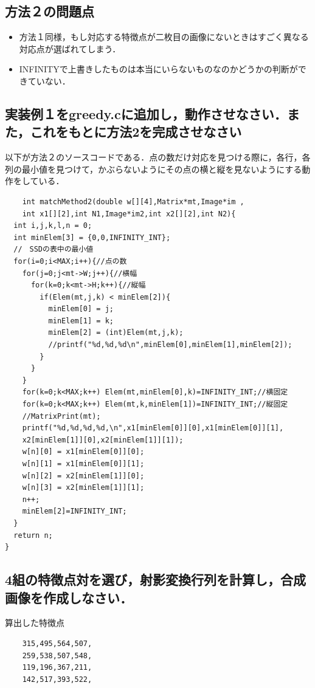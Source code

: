 \documentclass[11pt]{jarticle}
\begin{document}
\subsection{方法２の問題点}
\begin{itemize}
    \item 方法１同様，もし対応する特徴点が二枚目の画像にないときはすごく異なる対応点が選ばれてしまう．
    \item INFINITYで上書きしたものは本当にいらないものなのかどうかの判断ができていない．
  \end{itemize}

\subsection{実装例１をgreedy.cに追加し，動作させなさい．また，これをもとに方法2を完成させなさい}
以下が方法２のソースコードである．点の数だけ対応を見つける際に，各行，各列の最小値を見つけて，かぶらないようにその点の横と縦を見ないようにする動作をしている．
\begin{verbatim}
    int matchMethod2(double w[][4],Matrix*mt,Image*im ,
    int x1[][2],int N1,Image*im2,int x2[][2],int N2){
  int i,j,k,l,n = 0;
  int minElem[3] = {0,0,INFINITY_INT};
  //　SSDの表中の最小値
  for(i=0;i<MAX;i++){//点の数
    for(j=0;j<mt->W;j++){//横幅
      for(k=0;k<mt->H;k++){//縦幅
        if(Elem(mt,j,k) < minElem[2]){
          minElem[0] = j;
          minElem[1] = k;
          minElem[2] = (int)Elem(mt,j,k);
          //printf("%d,%d,%d\n",minElem[0],minElem[1],minElem[2]);
        }
      }
    }
    for(k=0;k<MAX;k++) Elem(mt,minElem[0],k)=INFINITY_INT;//横固定
    for(k=0;k<MAX;k++) Elem(mt,k,minElem[1])=INFINITY_INT;//縦固定
    //MatrixPrint(mt);
    printf("%d,%d,%d,%d,\n",x1[minElem[0]][0],x1[minElem[0]][1],
    x2[minElem[1]][0],x2[minElem[1]][1]);
    w[n][0] = x1[minElem[0]][0];
    w[n][1] = x1[minElem[0]][1];
    w[n][2] = x2[minElem[1]][0];
    w[n][3] = x2[minElem[1]][1];
    n++;
    minElem[2]=INFINITY_INT;
  }
  return n;
}
\end{verbatim}
\subsection{4組の特徴点対を選び，射影変換行列を計算し，合成画像を作成しなさい．}
算出した特徴点
\begin{verbatim}
    315,495,564,507,
    259,538,507,548,
    119,196,367,211,
    142,517,393,522,
\end{verbatim}
\end{document}
